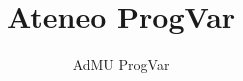 \documentclass[8pt,a4paper,landscape,oneside]{amsart}
\title{\TEAMNAME{}}
\title{Ateneo ProgVar}
\subtitle{AdMU ProgVar}
\date{\ddmmyyyydate{\today{}}}
\newcommand{\code}[1]{\inputminted[fontsize=\normalsize,baselinestretch=1]{cpp}{_code/#1}}
\begin{document}
\begin{multicols*}{3}
\maketitle
\thispagestyle{fancy}
\vspace{-3em}
\tableofcontents


\begin{comment}
\section{Code Templates}
	\code{header.cpp}
\end{comment}








\ifdefined\ICPCCONFIG
  
  
  
\fi

\clearpage


\end{multicols*}
\end{document}
